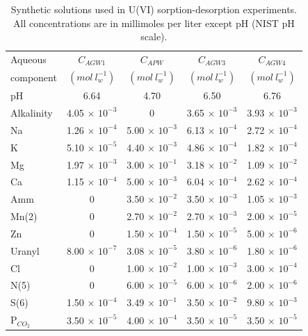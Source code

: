 \begin{table}[hb]
\caption{Synthetic solutions used in U(VI) sorption-desorption experiments.  All concentrations are in millimoles per liter except pH (NIST pH scale).}
\begin{center}
\begin{tabular}{l c c c c}
\hline
 Aqueous       & $C_{AGW1}$              & $C_{APW}$               & $C_{AGW3}$              & $C_{AGW4}$ \\
 component     & $(mol\ l^{-1}_w)$       & $(mol\ l^{-1}_w)$       &   $(mol\ l^{-1}_w)$     & $(mol\ l^{-1}_w)$ \\ \hline
 pH            &   6.64                  &  4.70                   & 6.50                    & 6.76 \\
 Alkalinity    & 4.05 $\times$ $10^{-3}$ & 0                       & 3.65 $\times$ $10^{-3}$ & 3.93 $\times$ $10^{-3}$ \\ 
 Na            & 1.26 $\times$ $10^{-4}$ & 5.00 $\times$ $10^{-3}$ & 6.13 $\times$ $10^{-4}$ & 2.72 $\times$ $10^{-4}$ \\ 
 K             & 5.10 $\times$ $10^{-5}$ & 4.40 $\times$ $10^{-3}$ & 4.86 $\times$ $10^{-4}$ & 1.82 $\times$ $10^{-4}$ \\ 
 Mg            & 1.97 $\times$ $10^{-3}$ & 3.00 $\times$ $10^{-1}$ & 3.18 $\times$ $10^{-2}$ & 1.09 $\times$ $10^{-2}$ \\
 Ca            & 1.15 $\times$ $10^{-4}$ & 5.00 $\times$ $10^{-3}$ & 6.04 $\times$ $10^{-4}$ & 2.62 $\times$ $10^{-4}$ \\
 Amm           & 0                       & 3.50 $\times$ $10^{-2}$ & 3.50 $\times$ $10^{-3}$ & 1.05 $\times$ $10^{-3}$ \\
 Mn(2)         & 0                       & 2.70 $\times$ $10^{-2}$ & 2.70 $\times$ $10^{-3}$ & 2.00 $\times$ $10^{-5}$ \\
 Zn            & 0                       & 1.50 $\times$ $10^{-4}$ & 1.50 $\times$ $10^{-5}$ & 5.00 $\times$ $10^{-6}$ \\
 Uranyl        & 8.00 $\times$ $10^{-7}$ & 3.08 $\times$ $10^{-5}$ & 3.80 $\times$ $10^{-6}$ & 1.80 $\times$ $10^{-6}$ \\
 Cl            &  0                      & 1.00 $\times$ $10^{-2}$ & 1.00 $\times$ $10^{-3}$ & 3.00 $\times$ $10^{-4}$ \\
 N(5)          &  0                      & 6.00 $\times$ $10^{-5}$ & 6.00 $\times$ $10^{-6}$ & 2.00 $\times$ $10^{-6}$ \\ 
 S(6)          & 1.50 $\times$ $10^{-4}$ & 3.49 $\times$ $10^{-1}$ & 3.50 $\times$ $10^{-2}$ & 9.80 $\times$ $10^{-3}$ \\
 P$_{CO_2}$    & 3.50 $\times$ $10^{-5}$ & 4.00 $\times$ $10^{-4}$ & 3.50 $\times$ $10^{-5}$ & 3.50 $\times$ $10^{-5}$ \\ \hline
\end{tabular}
\label{ex_u_scm}
\end{center}
\end{table}

